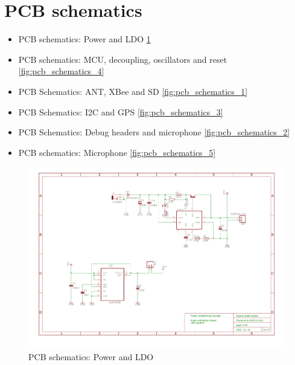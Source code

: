 \clearpage

\section{PCB schematics}
\label{sec:pcb_schematics}
\begin{itemize}
\item PCB schematics: Power and LDO \ref{fig:pcb_schematics_6}
\item PCB schematics: MCU, decoupling, oscillators and reset \ref{fig:pcb_schematics_4}
\item PCB Schematics: ANT, XBee and SD \ref{fig:pcb_schematics_1}
\item PCB Schematics: I2C and GPS \ref{fig:pcb_schematics_3}
\item PCB Schematics: Debug headers and microphone \ref{fig:pcb_schematics_2}
\item PCB schematics: Microphone \ref{fig:pcb_schematics_5}
\end{itemize}


\begin{figure}[htb]
\centering
\includegraphics[width=\columnwidth]{Images/pcb_power_ldo}
\caption{PCB schematics: Power and LDO}
\label{fig:pcb_schematics_6}
\end{figure}

